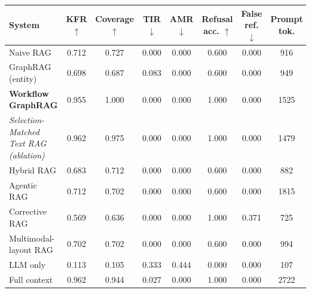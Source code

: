 \begin{tabular}{lccccccc}
\toprule
System & KFR $\uparrow$ & Coverage $\uparrow$ & TIR $\downarrow$ & AMR $\downarrow$ & Refusal acc. $\uparrow$ & False ref. $\downarrow$ & Prompt tok. \\
\midrule
Naive RAG & 0.712 & 0.727 & 0.000 & 0.000 & 0.600 & 0.000 & 916 \\
GraphRAG (entity) & 0.698 & 0.687 & 0.083 & 0.000 & 0.600 & 0.000 & 949 \\
\textbf{Workflow GraphRAG} & 0.955 & 1.000 & 0.000 & 0.000 & 1.000 & 0.000 & 1525 \\
\textit{Selection-Matched Text RAG (ablation)} & 0.962 & 0.975 & 0.000 & 0.000 & 1.000 & 0.000 & 1479 \\
\midrule
Hybrid RAG & 0.683 & 0.712 & 0.000 & 0.000 & 0.600 & 0.000 & 882 \\
Agentic RAG & 0.712 & 0.702 & 0.000 & 0.000 & 0.600 & 0.000 & 1815 \\
Corrective RAG & 0.569 & 0.636 & 0.000 & 0.000 & 1.000 & 0.371 & 725 \\
Multimodal-layout RAG & 0.702 & 0.702 & 0.000 & 0.000 & 0.600 & 0.000 & 994 \\
\midrule
LLM only & 0.113 & 0.105 & 0.333 & 0.444 & 0.000 & 0.000 & 107 \\
Full context & 0.962 & 0.944 & 0.027 & 0.000 & 1.000 & 0.000 & 2722 \\
\bottomrule
\end{tabular}
